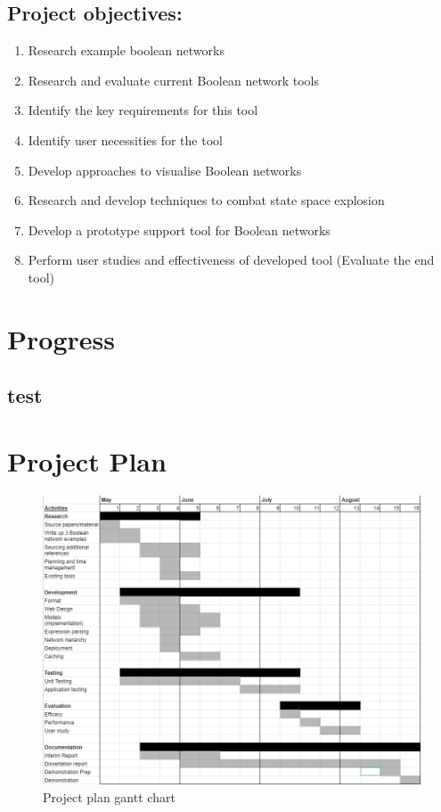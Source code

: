 \documentclass[12pt, letterpaper]{article}
\begin{document}
    \subsection{Project objectives:}
    \begin{enumerate}[noitemsep]
      \item Research example boolean networks
      \item Research and evaluate current Boolean network tools
      \item Identify the key requirements for this tool 
      \item Identify user necessities for the tool
      \item Develop approaches to visualise Boolean networks
      \item Research and develop techniques to combat state space explosion
      \item Develop a prototype support tool for Boolean networks
      \item Perform user studies and effectiveness of developed tool (Evaluate the end tool)  
    \end{enumerate}

  \section{Progress}

  \subsection{test}

  \newpage

  \section{Project Plan}

  \begin{figure}[H]
    \begin{center}
      \includegraphics[scale=0.5]{Chart.png}
    \end{center}
    \caption{Project plan gantt chart}
    \label{fig:GanttChart}
  \end{figure}

  \newpage

  
  
\end{document}
